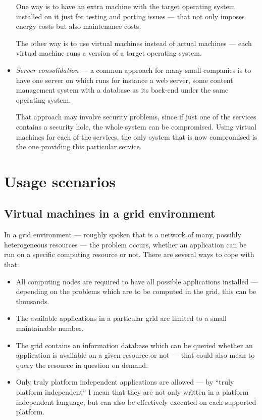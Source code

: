 \begin{itemize}
  One way  is to have  an extra machine  with the target  operating system
  installed on  it just for testing  and porting issues ---  that not only
  imposes energy  costs but also maintenance  costs.

  The other way is to use  virtual machines instead of actual machines ---
  each virtual machine runs a version of a target operating system.
\item  \emph{Server consolidation} ---  a common  approach for  many small
  companies is to have one server on which runs for instance a web server,
  some content management system with a database as its back-end under the
  same  operating system.

  That approach  may involve security problems,  since if just  one of the
  services   contains  a   security  hole,   the  whole   system   can  be
  compromised. Using virtual  machines for each of the  services, the only
  system  that is  now compromised  is the  one providing  this particular
  service.
\end{itemize}

\section{Usage scenarios}
\label{sec:usage}

\subsection{Virtual machines in a grid environment}

In  a grid  environment ---  roughly  spoken that  is a  network of  many,
possibly  heterogeneous  resources  ---  the problem  occurs,  whether  an
application can be run on a  specific computing resource or not. There are
several ways to cope with that:

\begin{itemize}
\item All computing  nodes are required to have  all possible applications
  installed --- depending on the problems  which are to be computed in the
  grid, this can be thousands.
\item The  available applications  in a particular  grid are limited  to a
  small maintainable number.
\item  The grid  contains an  information  database which  can be  queried
  whether an application is available on  a given resource or not --- that
  could also mean to query the resource in question on demand.
\item  Only truly  platform independent  applications are  allowed  --- by
  ``truly platform independent'' I mean  that they are not only written in
  a platform independent language, but can also be effectively executed on
  each supported platform.
\end{itemize}

